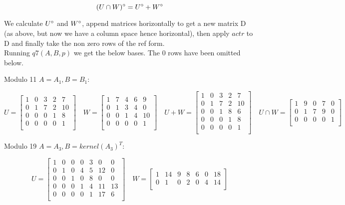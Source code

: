 \documentclass[10pt,a4paper]{report}
\begin{document}
\begin{equation*}
(U \cap W)\degree = U\degree + W\degree
\end{equation*} 

We calculate $U\degree$ and $W\degree$, append matrices horizontally to get a new matrix D (as above, but now we have a column space hence horizontal), then apply $actr$ to D and finally take the non zero rows of the ref form.\\

Running $q7(A,B,p)$ we get the below bases. The 0 rows have been omitted below.

\newpage

Modulo 11 $A=A_1, B=B_1$:

\begin{equation*}
U=\begin{bmatrix}
1 & 0 & 3 & 2 & 7 \\
0 & 1 & 7 & 2 & 10\\
0 & 0 & 0 & 1 & 8\\
0 & 0 & 0 & 0 & 1\\
\end{bmatrix}
\quad  
W=\begin{bmatrix}
1 & 7 & 4 & 6 & 9 \\
0 & 1 & 3 & 4 & 0\\
0 & 0 & 1 & 4 & 10\\
0 & 0 & 0 & 0 & 1\\
\end{bmatrix}
\quad 
U+W=\begin{bmatrix}
1 & 0 & 3 & 2 & 7 \\
0 & 1 & 7 & 2 & 10\\
0 & 0 & 1 & 8 & 6\\
0 & 0 & 0 & 1 & 8\\
0 & 0 & 0 & 0 & 1\\
\end{bmatrix}
\quad 
U \cap W=\begin{bmatrix}
1 & 9 & 0 & 7 & 0 \\
0 & 1 & 7 & 9 & 0\\
0 & 0 & 0 & 0 & 1\\
\end{bmatrix}
\end{equation*}

\vspace{1cm}

Modulo 19 $A=A_3, B=kernel(A_3)^T$:


\begin{equation*}
U=\begin{bmatrix}
1 & 0 & 0 & 0 & 3 & 0 & 0 \\
0 & 1 & 0 & 4 & 5 & 12 & 0 \\
0 & 0 & 1 & 0 & 8 & 0 & 0 \\
0 & 0 & 0 & 1 & 4 & 11 & 13 \\
0 & 0 & 0 & 0 & 1 & 17 & 6 \\
\end{bmatrix}
\quad
W=\begin{bmatrix}
1 & 14 & 9 & 8 & 6 & 0 & 18 \\
0 & 1 & 0 & 2 & 0 & 4 & 14 \\
\end{bmatrix}
\end{equation*}
\end{document}
